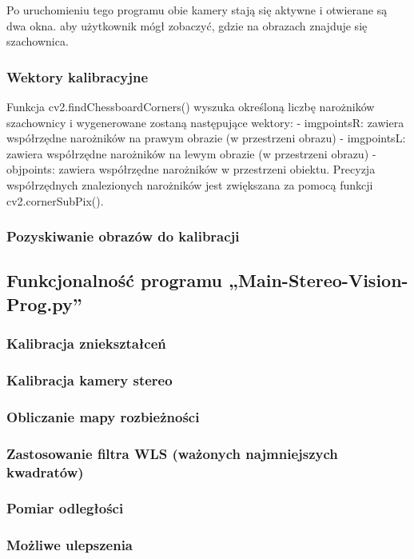 \documentclass[magisterska]{pracadypl}
\begin{document}
Po uruchomieniu tego programu obie kamery stają się aktywne i otwierane są dwa okna.
aby użytkownik mógł zobaczyć, gdzie na obrazach znajduje się szachownica.

\subsubsection{Wektory kalibracyjne}

Funkcja cv2.findChessboardCorners() wyszuka określoną liczbę narożników szachownicy
i wygenerowane zostaną następujące wektory:
- imgpointsR: zawiera współrzędne narożników na prawym obrazie (w przestrzeni obrazu)
- imgpointsL: zawiera współrzędne narożników na lewym obrazie (w przestrzeni obrazu)
- objpoints: zawiera współrzędne narożników w przestrzeni obiektu.
Precyzja współrzędnych znalezionych narożników jest zwiększana za pomocą funkcji
cv2.cornerSubPix().

\subsubsection{Pozyskiwanie obrazów do kalibracji}
\subsection{Funkcjonalność programu „Main-Stereo-Vision-Prog.py”}
\subsubsection{Kalibracja zniekształceń}
\subsubsection{Kalibracja kamery stereo}
\subsubsection{Obliczanie mapy rozbieżności}
\subsubsection{Zastosowanie filtra WLS (ważonych najmniejszych kwadratów)}
\subsubsection{Pomiar odległości}
\subsubsection{Możliwe ulepszenia}
\end{document}
